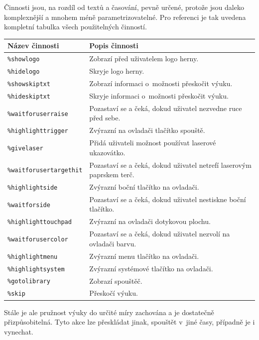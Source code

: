 \newpage

Činnosti jsou, na rozdíl od textů a časování, pevně určené, protože jsou
daleko komplexnější a mnohem méně parametrizovatelné. Pro referenci je
tak uvedena kompletní tabulka všech použitelných činností.

\begin{longtabu} to \textwidth {XX}
\toprule

Název činnosti
& 
Popis činnosti
\tabularnewline
\midrule
\endhead
\texttt{\%showlogo}
& 
Zobrazí před uživatelem logo herny.
\tabularnewline

\texttt{\%hidelogo}
& 
Skryje logo herny.
\tabularnewline

\texttt{\%showskiptxt}
& 
Zobrazí informaci o~možnosti přeskočit výuku.
\tabularnewline

\texttt{\%hideskiptxt}
& 
Skryje informaci o~možnosti přeskočit výuku.
\tabularnewline

\texttt{\%waitforuserraise}
& 
Pozastaví se a čeká, dokud uživatel nezvedne ruce před sebe.
\tabularnewline

\texttt{\%highlighttrigger}
& 
Zvýrazní na ovladači tlačítko spouště.
\tabularnewline

\texttt{\%givelaser}
& 
Přidá uživateli možnost používat laserové ukazovátko.
\tabularnewline

\texttt{\%waitforusertargethit}
& 
Pozastaví se a čeká, dokud uživatel netrefí laserovým paprskem
terč.
\tabularnewline

\texttt{\%highlightside}
& 
Zvýrazní boční tlačítko na ovladači.
\tabularnewline

\texttt{\%waitforside}
& 
Pozastaví se a čeká, dokud uživatel nestiskne boční tlačítko.
\tabularnewline

\texttt{\%highlighttouchpad}
& 
Zvýrazní na ovladači dotykovou plochu.
\tabularnewline

\texttt{\%waitforusercolor}
& 
Pozastaví se a čeká, dokud uživatel nezvolí na ovladači barvu.
\tabularnewline

\texttt{\%highlightmenu}
& 
Zvýrazní menu tlačítko na ovladači.
\tabularnewline

\texttt{\%highlightsystem}
& 
Zvýrazní systémové tlačítko na ovladači.
\tabularnewline

\texttt{\%gotolibrary}
& 
Zobrazí spouštěč.
\tabularnewline

\texttt{\%skip}
& 
Přeskočí výuku.
\tabularnewline
\bottomrule
\end{longtabu}

Stále je ale pružnost výuky do určité míry zachována a je dostatečně
přizpůsobitelná. Tyto akce lze přeskládat jinak, spouštět v~jiné časy,
případně je i vynechat.

